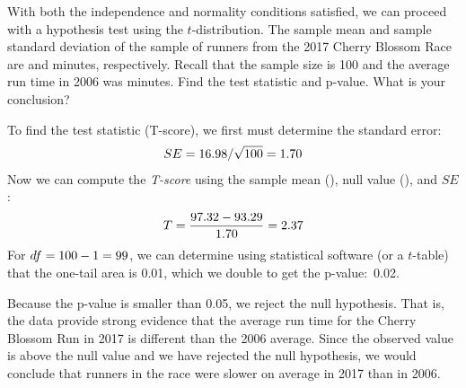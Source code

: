 \D{\newpage}


\begin{examplewrap}
\begin{nexample}{With both the independence
    and normality conditions satisfied,
    we can proceed with a hypothesis test using
    the $t$-distribution.
    The sample mean and sample standard deviation
    of the sample
    of \cherryblossomn{} runners from the
    2017 Cherry Blossom Race
    are \cherryblossommean{} and \cherryblossomsd{} minutes,
    respectively.
    Recall that the sample size is 100
    and the average run time in 2006 was
    \cherryblossomnull{} minutes.
    Find the test statistic and p-value.
    What is your conclusion?}

  To find the test statistic (T-score),
  we first must determine the standard error:
  \begin{align*}
  SE
    = 16.98{} / \sqrt{100{}}
    = 1.70{}
  \end{align*}
  Now we can compute the \emph{T-score}
  using the sample mean (\cherryblossommean{}),
  null value (\cherryblossomnull{}), and $SE$:
  \begin{align*}
  T
    = \frac{97.32{} - 93.29{}}
        {1.70{}}
    = 2.37{}
  \end{align*}
  For $df = 100{} - 1 = 99$,
  we can determine using statistical software
  (or a $t$-table) that the one-tail area is 0.01,
  which we double to get the p-value:~0.02.

  Because the p-value is smaller than 0.05,
  we reject the null hypothesis.
  That is, the data provide strong evidence that the average
  run time for the Cherry Blossom Run in 2017 is different
  than the 2006 average.
  Since the observed value is above the null value
  and we have rejected the null hypothesis, we would conclude
  that runners in the race were slower on average in 2017
  than in 2006.
\end{nexample}
\end{examplewrap}

